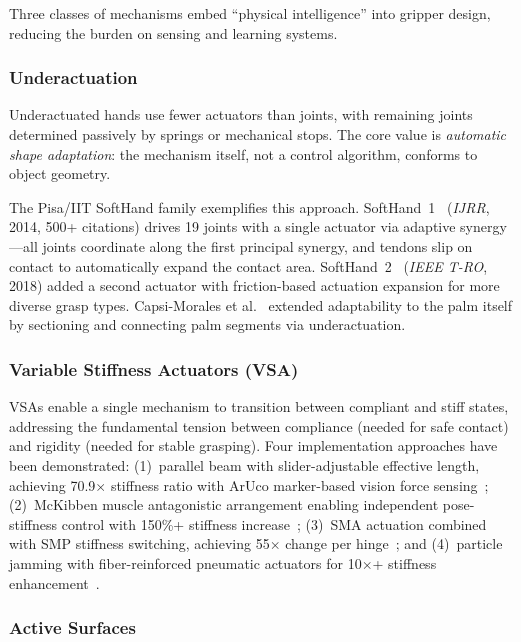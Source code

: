 Three classes of mechanisms embed ``physical intelligence'' into gripper design, reducing the burden on sensing and learning systems.

\subsubsection{Underactuation}

Underactuated hands use fewer actuators than joints, with remaining joints determined passively by springs or mechanical stops. The core value is \emph{automatic shape adaptation}: the mechanism itself, not a control algorithm, conforms to object geometry.

The Pisa/IIT SoftHand family exemplifies this approach. SoftHand~1~\cite{catalano2014softhand} (\emph{IJRR}, 2014, 500+ citations) drives 19 joints with a single actuator via adaptive synergy---all joints coordinate along the first principal synergy, and tendons slip on contact to automatically expand the contact area. SoftHand~2~\cite{dellasantina2018softhand2} (\emph{IEEE T-RO}, 2018) added a second actuator with friction-based actuation expansion for more diverse grasp types. Capsi-Morales et al.~\cite{capsimorales2020palm} extended adaptability to the palm itself by sectioning and connecting palm segments via underactuation.

\subsubsection{Variable Stiffness Actuators (VSA)}

VSAs enable a single mechanism to transition between compliant and stiff states, addressing the fundamental tension between compliance (needed for safe contact) and rigidity (needed for stable grasping). Four implementation approaches have been demonstrated: (1)~parallel beam with slider-adjustable effective length, achieving 70.9$\times$ stiffness ratio with ArUco marker-based vision force sensing~\cite{fu2023vsa}; (2)~McKibben muscle antagonistic arrangement enabling independent pose-stiffness control with 150\%+ stiffness increase~\cite{alabeach2017vsa}; (3)~SMA actuation combined with SMP stiffness switching, achieving 55$\times$ change per hinge~\cite{wang2017sma}; and (4)~particle jamming with fiber-reinforced pneumatic actuators for 10$\times$+ stiffness enhancement~\cite{wei2016jamming}.

\subsubsection{Active Surfaces}

